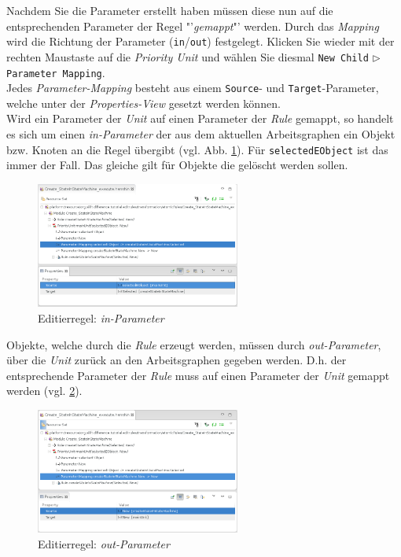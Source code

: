 \documentclass[a4paper]{scrartcl}
\begin{document}
Nachdem Sie die Parameter erstellt haben müssen diese nun auf die entsprechenden Parameter der Regel "'\textit{gemappt}"' werden.
Durch das \textit{Mapping} wird die Richtung der Parameter (\texttt{in}/\texttt{out}) festgelegt.
Klicken Sie wieder mit der rechten Maustaste auf die \textit{Priority Unit} und wählen Sie diesmal \texttt{New Child} $\triangleright$ \texttt{Parameter Mapping}.\\
Jedes \textit{Parameter-Mapping} besteht aus einem \texttt{Source}- und \texttt{Target}-Parameter, welche unter der \textit{Properties-View} gesetzt werden können.\\

\label{in/out_parameter}
Wird ein Parameter der \textit{Unit} auf einen Parameter der \textit{Rule} gemappt, so handelt es sich um einen \textit{in-Parameter} der aus dem aktuellen Arbeitsgraphen ein Objekt bzw. Knoten an die Regel übergibt (vgl. Abb. \ref{silift-editrule_parametermapping_in}). 
Für \texttt{selectedEObject} ist das immer der Fall. 
Das gleiche gilt für Objekte die gelöscht werden sollen.

\begin{figure}[H]
\centering
\includegraphics[width=0.6\textwidth]{graphics/silift-editrule_parametermapping_in.png}
\caption{Editierregel: \textit{in-Parameter}}
\label{silift-editrule_parametermapping_in}
\end{figure}

Objekte, welche durch die \textit{Rule} erzeugt werden, müssen durch \textit{out-Parameter}, über die \textit{Unit} zurück an den Arbeitsgraphen gegeben werden.
D.h. der entsprechende Parameter der \textit{Rule} muss auf einen Parameter der \textit{Unit} gemappt werden (vgl. \ref{silift-editrule_parametermapping_out}).
 
\begin{figure}[H]
\centering
\includegraphics[width=0.6\textwidth]{graphics/silift-editrule_parametermapping_out.png}
\caption{Editierregel: \textit{out-Parameter}}
\label{silift-editrule_parametermapping_out}
\end{figure}
\end{document}
